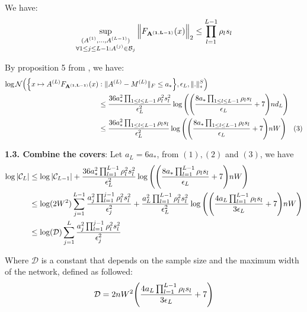 \noindent We have:
\begin{align*}
    \sup_{\substack{
        (A^{(1)}, \dots, A^{(L-1)}) \\
        \forall 1 \le j \le L-1 : A^{(j)}\in\mathcal{B}_j
    }} \Big\|
        F_{\bf A^{(1, L-1)}}(x)
    \Big\|_2 \le \prod_{l=1}^{L-1} \rho_ls_l
\end{align*}

\noindent By proposition 5 from \cite{article:ledent_and_mustafa}, we have:
\begin{align*}
    \log\mathcal{N}\Big( 
        \Big\{ 
            x\mapsto A^{(L)}F_{\bf A^{(1, L-1)}}(x) &: \|A^{(L)} - M^{(L)}\|_F \le a_*
         \Big\}, \epsilon_L, \|.\|_*^S
     \Big) \\
    &\le \frac{36a_*^2\prod_{1\le l \le L-1}\rho_l^2s_l^2}{\epsilon_L^2}\log\Bigg( 
        \Bigg( 
            \frac{8a_*\prod_{1\le l \le L-1}\rho_ls_l}{\epsilon_L} + 7
         \Bigg)nd_L
     \Bigg) \\
    &\le \frac{36a_*^2\prod_{1\le l \le L-1}\rho_ls_l}{\epsilon_L^2}\log\Bigg( 
        \Bigg( 
            \frac{8a_*\prod_{1\le l \le L-1}\rho_ls_l}{\epsilon_L} + 7
         \Bigg)nW
     \Bigg) \ \ \ (3)
\end{align*}

\noindent\newline\textbf{1.3. Combine the covers}: Let $a_L = 6a_*$, from $(1), (2)$ and $(3)$, we have
\begin{align*}
    \log|\mathcal{C}_L| 
    &\le \log|\mathcal{C}_{L-1}| + \frac{36a_*^2\prod_{l=1}^{L-1}\rho_l^2s_l^2}{\epsilon_L^2}\log\Bigg( 
        \Bigg( 
            \frac{8a_*\prod_{l=1}^{L-1}\rho_ls_l}{\epsilon_L} + 7
         \Bigg)nW
     \Bigg)
    \\
    &\le \log(2W^2)\sum_{j=1}^{L-1}\frac{a_j^2\prod_{l=1}^{j-1}\rho_l^2s_l^2}{\epsilon_j^2} + \frac{a_L^2\prod_{l=1}^{L-1}\rho_l^2s_l^2}{\epsilon_L^2}\log\Bigg( 
        \Bigg( 
            \frac{4a_L\prod_{l=1}^{L-1}\rho_ls_l}{3\epsilon_L} + 7
         \Bigg)nW
     \Bigg) \\
    &\le \log(\mathcal{D}) \sum_{j=1}^L \frac{a_j^2\prod_{l=1}^{j-1}\rho_l^2s_l^2}{\epsilon_j^2}
\end{align*}

\noindent Where $\mathcal{D}$ is a constant that depends on the sample size and the maximum width of the network, defined as followed: 
\begin{align*}
    \mathcal{D} = 
        2nW^2\Bigg( 
            \frac{4a_L \prod_{l=1}^{L-1}\rho_ls_l}{3\epsilon_L} + 7
         \Bigg)
\end{align*}

